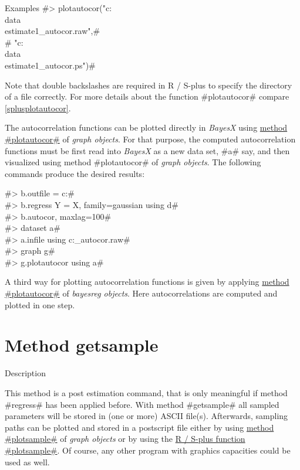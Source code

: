 \begin{stanza}{Examples}
 #> plotautocor("c:\\data\\estimate1_autocor.raw",#\\
 #  "c:\\data\\estimate1_autocor.ps")#

Note that double backslashes are required in R / S-plus to specify
the directory of a file correctly. For more details about the
function #plotautocor# compare \autoref{splusplotautocor}.

The autocorrelation functions can be plotted directly in {\em
BayesX} using \hyperref[graphplotautocor]{method #plotautocor#} of
{\em graph objects}. For that purpose, the computed autocorrelation
functions must be first read into {\em BayesX} as a new data set,
#a# say, and then visualized using method #plotautocor# of {\em
graph objects}. The following commands produce the desired results:

#> b.outfile = c:\data{}# \\
#> b.regress Y = X, family=gaussian using d# \\
#> b.autocor, maxlag=100# \\
#> dataset a# \\
#> a.infile using c:\data{}_autocor.raw# \\
#> graph g# \\
#> g.plotautocor using a#

A third way for plotting autocorrelation functions is given by
applying \hyperref[plotautocor]{method #plotautocor#} of {\em
bayesreg objects}. Here autocorrelations are computed and plotted in
one step.
\end{stanza}

\clearpage

\section{Method getsample}
\label{bayesgetsample} 

\begin{stanza}{Description}

This method is a post estimation command, that is only meaningful if
method #regress# has been applied before. With method #getsample#
all sampled parameters will be stored in (one or more) ASCII
file(s). Afterwards, sampling paths can be plotted and stored in a
postscript file either by using \hyperref[graphplotsample]{method
#plotsample#} of {\em graph objects} or by using the
\hyperref[splusplotsample]{R / S-plus function #plotsample#}. Of
course, any other program with graphics capacities could be used as
well.
\end{stanza}

